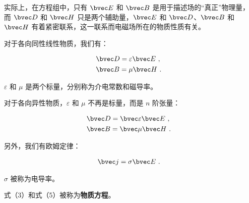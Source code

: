 实际上，在方程组中，只有 $\bvec E$ 和 $\bvec B$ 是用于描述场的“真正”物理量，而 $\bvec D$ 和 $\bvec H$ 只是两个辅助量，$\bvec E$ 和 $\bvec D$、$\bvec B$ 和 $\bvec H$ 有着紧密联系，这一联系而电磁场所在的物质性质有关。

对于各向同性线性物质，我们有：

\begin{equation}
\begin{aligned}
& \bvec D = \varepsilon \bvec E ~, \\
& \bvec B = \mu \bvec H ~.
\end{aligned}
\end{equation}

$\varepsilon$ 和 $\mu$ 是两个标量，分别称为介电常数和磁导率。

对于各向异性物质，$\varepsilon$ 和 $\mu$ 不再是标量，而是 $n$ 阶张量：

\begin{equation}
\begin{aligned}
& \bvec D = \bvec \varepsilon \bvec E ~, \\
& \bvec B = \bvec \mu \bvec H ~.
\end{aligned}
\end{equation}

另外，我们有欧姆定律：

\begin{equation}
\begin{aligned}
\bvec j = \sigma \bvec E ~.
\end{aligned}
\end{equation}

$\sigma$ 被称为电导率。

式（3）和式（5）被称为\textbf{物质方程}。


